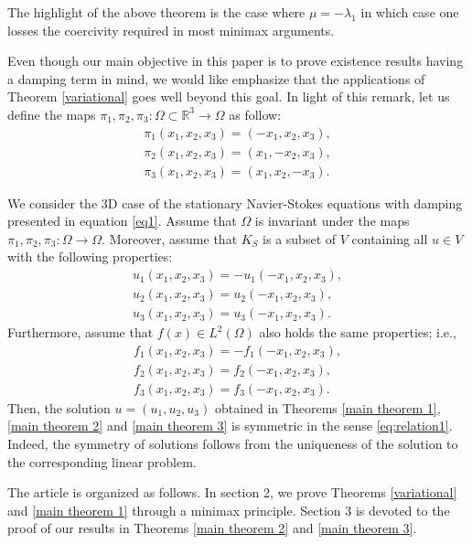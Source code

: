 \documentclass[reqno]{amsart}
\begin{document}
The highlight of the above theorem is the case where $\mu=-\lambda_1$ in which case
one losses the coercivity required in most minimax arguments.

\begin{remark}\label{symm} \rm
Even though our main objective in this paper is to prove existence results having
a damping term in mind,  we would like emphasize that the applications of Theorem
\ref{variational}  goes well beyond this goal.  In light of this remark, let us
define the maps $\pi_1,\pi_2,\pi_3: \Omega \subset \mathbb{R}^3 \to\Omega$ as follow:
\begin{gather*}
    \pi_1(x_1,x_2,x_3) = (-x_1,x_2,x_3), \\
    \pi_2(x_1,x_2,x_3) = (x_1,-x_2,x_3), \\
    \pi_3(x_1,x_2,x_3) = (x_1,x_2,-x_3).
\end{gather*}

We consider the 3D case of the stationary Navier-Stokes equations with damping
presented in equation \eqref{eq1}. Assume that $\Omega$ is invariant under the maps
$\pi_1, \pi_2, \pi_3: \Omega \to\Omega$.
Moreover, assume that $K_S$ is a subset of $V$ containing all $ u \in V$ with the
following properties:
\begin{equation}\label{eq:relation1}
\begin{gathered}
u_1(x_1,x_2,x_3) = -u_1(-x_1,x_2,x_3), \\
u_2(x_1,x_2,x_3) = u_2(-x_1,x_2,x_3), \\
u_3(x_1,x_2,x_3) = u_3(-x_1,x_2,x_3).
\end{gathered}
\end{equation}
Furthermore, assume that $f(x)\in L^2(\Omega)$ also holds the same properties; i.e.,
\begin{gather*}
f_1(x_1,x_2,x_3) = -f_1(-x_1,x_2,x_3), \\
f_2(x_1,x_2,x_3) = f_2(-x_1,x_2,x_3), \\
f_3(x_1,x_2,x_3) = f_3(-x_1,x_2,x_3).
\end{gather*}
Then, the solution $u=(u_1,u_2,u_3) $ obtained in Theorems \ref{main theorem 1},
\ref{main theorem 2} and \ref{main theorem 3}  is symmetric in the sense
\eqref{eq:relation1}. Indeed, the symmetry of solutions follows from the uniqueness
of the solution to the corresponding linear problem.
\end{remark}

The article is organized as follows. In section 2,
we  prove  Theorems \ref{variational} and  \ref{main theorem 1}
through a minimax principle.
Section 3 is devoted to the proof of our results in Theorems
\ref{main theorem 2} and \ref{main theorem 3}.
\end{document}
